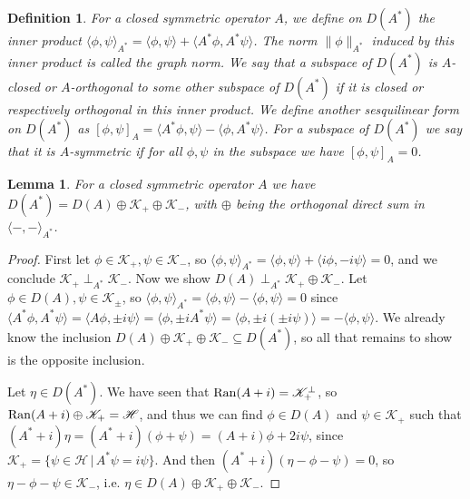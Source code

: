 \documentclass[12pt,oneside]{report}
\newtheorem{lem}[thm]{Lemma}
\newtheorem{defn}[thm]{Definition}
\begin{document}
\begin{defn}
    For a closed symmetric operator $A$, we define on $D(A^{*})$ the inner product $\langle \phi, \psi \rangle_{A^{*}} = \langle \phi, \psi \rangle + \langle A^{*}\phi, A^{*}\psi \rangle$. The norm $\|\phi\|_{A^{*}}$ induced by this inner product is called the graph norm. We say that a subspace of $D(A^{*})$ is $A$-closed or $A$-orthogonal to some other subspace of $D(A^{*})$ if it is closed or respectively orthogonal in this inner product. We define another sesquilinear form on $D(A^{*})$ as $[\phi,\psi]_{A} = \langle A^{*}\phi, \psi \rangle - \langle \phi, A^{*} \psi \rangle$. For a subspace of $D(A^{*})$ we say that it is $A$-symmetric if for all $\phi,\psi$ in the subspace we have $[\phi,\psi]_{A} = 0$.
\end{defn}

\begin{lem}
    For a closed symmetric operator $A$ we have $D(A^{*}) = D(A) \oplus \mathscr{K}_{+} \oplus \mathscr{K}_{-}$, with $\oplus$ being the orthogonal direct sum in $\langle -,- \rangle_{A^{*}}$.
\end{lem}
\begin{proof}
    First let $\phi \in \mathscr{K}_{+}, \psi \in \mathscr{K}_{-}$, so $\langle \phi,\psi \rangle_{A^{*}} = \langle \phi, \psi \rangle + \langle i\phi, -i\psi \rangle = 0$, and we conclude $\mathscr{K}_{+} \perp_{A^{*}} \mathscr{K}_{-}$. Now we show $D(A) \perp_{A^{*}} \mathscr{K}_{+} \oplus \mathscr{K}_{-}$. Let $\phi \in D(A), \psi \in \mathscr{K}_{\pm}$, so $\langle \phi, \psi \rangle_{A^{*}} = \langle \phi,\psi \rangle - \langle \phi,\psi \rangle = 0$ since $\langle A^{*}\phi, A^{*}\psi \rangle = \langle A\phi, \pm i\psi \rangle = \langle \phi, \pm i A^{*}\psi \rangle = \langle \phi, \pm i (\pm i \psi) \rangle = -\langle\phi, \psi \rangle$. We already know the inclusion $D(A) \oplus \mathscr{K}_{+} \oplus \mathscr{K}_{-} \subseteq D(A^{*})$, so all that remains to show is the opposite inclusion.

    Let $\eta \in D(A^{*})$. We have seen that $\mathrm{Ran}(A + i) = \mathscr{K}_{+}^{\perp}$, so $\mathrm{Ran}(A + i) \oplus \mathscr{K}_{+} = \mathscr{H}$, and thus we can find $\phi \in D(A)$ and $\psi \in \mathscr{K}_{+}$ such that $(A^{*}+i)\eta = (A^{*}+i)(\phi + \psi) = (A+i)\phi + 2i\psi$, since $\mathscr{K}_{+} = \{ \psi \in \mathscr{H} \, | \, A^{*}\psi = i \psi \}$. And then $(A^{*} + i)(\eta-\phi-\psi) = 0$, so $\eta - \phi - \psi \in \mathscr{K}_{-}$, i.e. $\eta \in D(A) \oplus \mathscr{K}_{+} \oplus \mathscr{K}_{-}$.
\end{proof}
\end{document}
